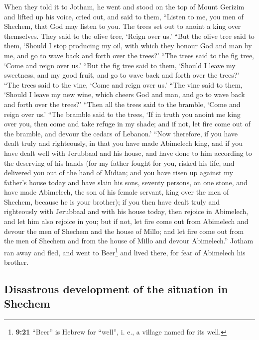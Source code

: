  When they told it to Jotham, he went and stood on the top
of Mount Gerizim and lifted up his voice, cried out, and said to them,
``Listen to me, you men of Shechem, that God may listen to you.
 The trees set out to anoint a king over themselves. They
said to the olive tree, `Reign over us.'  ``But the olive
tree said to them, `Should I stop producing my oil, with which they
honour God and man by me, and go to wave back and forth over the trees?'
 ``The trees said to the fig tree, `Come and reign over
us.'  ``But the fig tree said to them, `Should I leave my
sweetness, and my good fruit, and go to wave back and forth over the
trees?'  ``The trees said to the vine, `Come and reign
over us.'  ``The vine said to them, `Should I leave my
new wine, which cheers God and man, and go to wave back and forth over
the trees?'  ``Then all the trees said to the bramble,
`Come and reign over us.'  ``The bramble said to the
trees, `If in truth you anoint me king over you, then come and take
refuge in my shade; and if not, let fire come out of the bramble, and
devour the cedars of Lebanon.'  ``Now therefore, if you
have dealt truly and righteously, in that you have made Abimelech king,
and if you have dealt well with Jerubbaal and his house, and have done
to him according to the deserving of his hands  (for my
father fought for you, risked his life, and delivered you out of the
hand of Midian;  and you have risen up against my
father's house today and have slain his sons, seventy persons, on one
stone, and have made Abimelech, the son of his female servant, king over
the men of Shechem, because he is your brother);  if you
then have dealt truly and righteously with Jerubbaal and with his house
today, then rejoice in Abimelech, and let him also rejoice in you;
 but if not, let fire come out from Abimelech and devour
the men of Shechem and the house of Millo; and let fire come out from
the men of Shechem and from the house of Millo and devour Abimelech.''
 Jotham ran away and fled, and went to Beer\footnote{\textbf{9:21}
  ``Beer'' is Hebrew for ``well'', i. e., a village named for its well.}
and lived there, for fear of Abimelech his brother.

\hypertarget{disastrous-development-of-the-situation-in-shechem}{%
\subsection{Disastrous development of the situation in
Shechem}\label{disastrous-development-of-the-situation-in-shechem}}

